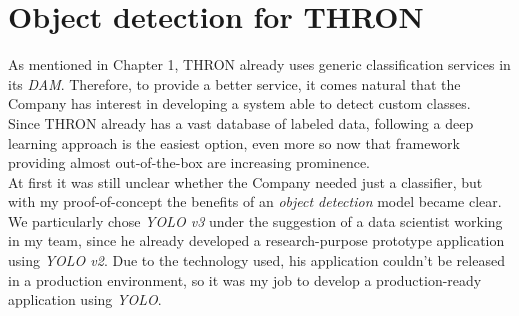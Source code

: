 \section{Object detection for THRON}
	As mentioned in Chapter 1, THRON already uses generic classification services in its \emph{DAM}. Therefore, to provide a better service, it comes natural that the Company has interest in developing a system able to detect custom classes. \\
	Since THRON already has a vast database of labeled data, following a deep learning approach is the easiest option, even more so now that framework providing almost out-of-the-box are increasing prominence. \\
	At first it was still unclear whether the Company needed just a classifier, but with my proof-of-concept the benefits of an \emph{object detection} model became clear. We particularly chose \emph{YOLO v3} under the suggestion of a data scientist working in my team, since he already developed a research-purpose prototype application using \emph{YOLO v2}. Due to the technology used, his application couldn't be released in a production environment, so it was my job to develop a production-ready application using \emph{YOLO}.